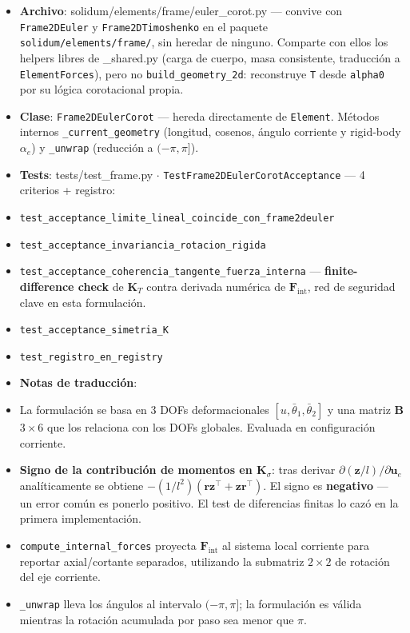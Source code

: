 \documentclass[11pt,letterpaper,oneside]{report}
\begin{document}
\begin{itemize}
  \item \textbf{Archivo}: solidum/elements/frame/euler\_corot.py --- convive con \texttt{Frame2DEuler} y \texttt{Frame2DTimoshenko} en el paquete \texttt{solidum/elements/frame/}, sin heredar de ninguno. Comparte con ellos los helpers libres de \_shared.py (carga de cuerpo, masa consistente, traducción a \texttt{ElementForces}), pero no \texttt{build\_geometry\_2d}: reconstruye \texttt{T} desde \texttt{alpha0} por su lógica corotacional propia.
  \item \textbf{Clase}: \texttt{Frame2DEulerCorot} --- hereda directamente de \texttt{Element}. Métodos internos \texttt{\_current\_geometry} (longitud, cosenos, ángulo corriente y rigid-body $\alpha_e$) y \texttt{\_unwrap} (reducción a $(-\pi, \pi]$).
  \item \textbf{Tests}: tests/test\_frame.py \ensuremath{\cdot} \texttt{TestFrame2DEulerCorotAcceptance} --- 4 criterios + registro:
  \item \texttt{test\_acceptance\_limite\_lineal\_coincide\_con\_frame2deuler}
  \item \texttt{test\_acceptance\_invariancia\_rotacion\_rigida}
  \item \texttt{test\_acceptance\_coherencia\_tangente\_fuerza\_interna} --- \textbf{finite-difference check} de $\mathbf K_T$ contra derivada numérica de $\mathbf F_{\text{int}}$, red de seguridad clave en esta formulación.
  \item \texttt{test\_acceptance\_simetria\_K}
  \item \texttt{test\_registro\_en\_registry}
  \item \textbf{Notas de traducción}:
  \item La formulación se basa en 3 DOFs deformacionales $[u, \bar\theta_1, \bar\theta_2]$ y una matriz $\mathbf B$ $3\times 6$ que los relaciona con los DOFs globales. Evaluada en configuración corriente.
  \item \textbf{Signo de la contribución de momentos en $\mathbf K_\sigma$}: tras derivar $\partial(\mathbf z/l)/\partial\mathbf u_e$ analíticamente se obtiene $-(1/l^2)(\mathbf r\mathbf z^\top + \mathbf z\mathbf r^\top)$. El signo es \textbf{negativo} --- un error común es ponerlo positivo. El test de diferencias finitas lo cazó en la primera implementación.
  \item \texttt{compute\_internal\_forces} proyecta $\mathbf F_{\text{int}}$ al sistema local corriente para reportar axial/cortante separados, utilizando la submatriz $2\times 2$ de rotación del eje corriente.
  \item \texttt{\_unwrap} lleva los ángulos al intervalo $(-\pi, \pi]$; la formulación es válida mientras la rotación acumulada por paso sea menor que $\pi$.
\end{itemize}
\end{document}
